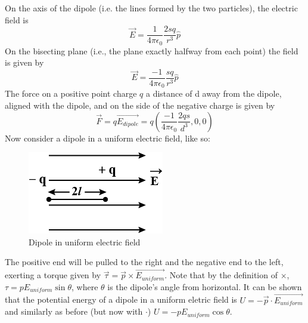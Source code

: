 \documentclass[nobib]{tufte-handout}
\begin{document}
On the axis of the dipole (i.e. the lines
formed by the two particles), the electric field is 
\[\vec{E} = \frac{1}{4\pi \epsilon_0}\frac{2sq}{r^3}\hat{p}\]
On the bisecting plane (i.e., the plane exactly halfway from each 
point) the field is given by
\[\vec{E} = \frac{-1}{4 \pi \epsilon_0}\frac{sq}{r^3}\hat{p}\]
The force on a positive point charge $q$ a 
distance of d away from the dipole, aligned with the dipole, and 
on the side of the negative charge is given by 
\[\vec{F}=q\vec{E_{dipole}}=q(\frac{-1}{4\pi \epsilon_0}\frac{2qs}{d^3},0,0)\]
Now consider a dipole in a uniform electric field, like so:
\begin{figure}
    \caption{Dipole in uniform electric field}
    \center
    \includegraphics[width=\textwidth /2]{images/dipoleinuniformelectricfield.png}
\end{figure}
The positive end will be pulled to the right and the negative 
end to the left, exerting a torque given by $\vec{\tau} = \vec{p} \times \vec{E_{uniform}}$.
Note that by the definition of $\times$, $\tau = p E_{uniform} \sin{\theta}$, where $\theta$ is the
dipole's angle from horizontal. It can be shown that the potential
energy of a dipole in a uniform eletric field is $U = -\vec{p} \cdot \vec{E_{uniform}}$
and similarly as before (but now with $\cdot$) $U = -p E_{uniform} \cos{\theta}$. 
\end{document}
